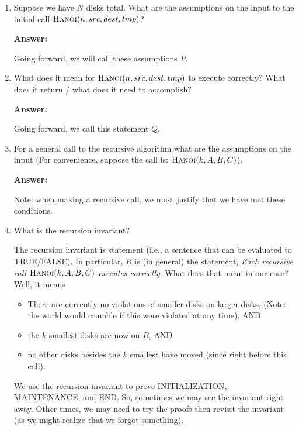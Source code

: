 \documentclass{article}
\newcommand{\answer}{\textbf{Answer:}\vspace{1.8in}}
\begin{document}
\begin{enumerate}
    \item Suppose we have $N$ disks total. What are the assumptions on the input
        to the initial call $\textsc{Hanoi}(n,src,dest,tmp)$?

        \answer

        Going forward, we will call these assumptions $P$.

    \pagebreak
    \item What does it mean for $\textsc{Hanoi}(n,src,dest,tmp)$ to execute
        correctly? What does it return / what does it need to accomplish?

        \answer

        Going forward, we call this statement $Q$.

    \item For a general call to the recursive algorithm what are the assumptions on the input
        (For convenience, suppose the call is: $\textsc{Hanoi}(k,A,B,C)$).

        \answer

        Note: when making a recursive call, we must justify that we have met
        these conditions.

    \item What is the recursion invariant?

        The recursion invariant is statement (i.e., a sentence that can be
        evaluated to TRUE/FALSE).
        In particular, $R$ is (in general) the statement,
        \emph{Each recursive call $\textsc{Hanoi}(k,A,B,C)$ executes
        correctly}.  What does that mean in our case?  Well, it means
        \begin{itemize}
            \item There are currently no violations of smaller disks on larger
                disks. (Note: the world would crumble if this were violated at
                any time), AND
            \item the $k$ smallest disks are now on $B$, AND
            \item no other disks besides the $k$ smallest have moved (since
                right before this call).
        \end{itemize}

        We use the recursion invariant to prove INITIALIZATION, MAINTENANCE, and
        END.  So, sometimes we may see the invariant right away.  Other times,
        we may need to try the proofs then revisit the invariant (as we might
        realize that we forgot something).


\end{enumerate}
\end{document}
